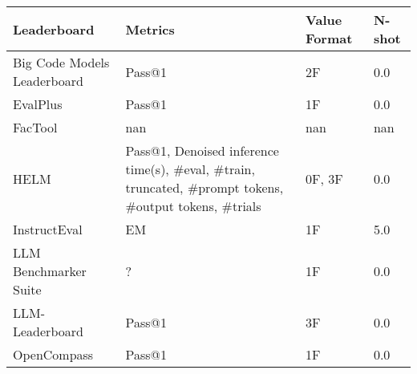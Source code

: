 \begin{tabular}{llll}
\toprule
Leaderboard & Metrics & Value Format & N-shot \\
\midrule
Big Code Models Leaderboard & Pass@1 & 2F & 0.0 \\
EvalPlus & Pass@1 & 1F & 0.0 \\
FacTool & nan & nan & nan \\
HELM & Pass@1, Denoised inference time(s), \#eval, \#train, truncated, \#prompt tokens, \#output tokens, \#trials & 0F, 3F & 0.0 \\
InstructEval & EM & 1F & 5.0 \\
LLM Benchmarker Suite & ? & 1F & 0.0 \\
LLM-Leaderboard & Pass@1 & 3F & 0.0 \\
OpenCompass & Pass@1 & 1F & 0.0 \\
\bottomrule
\end{tabular}
